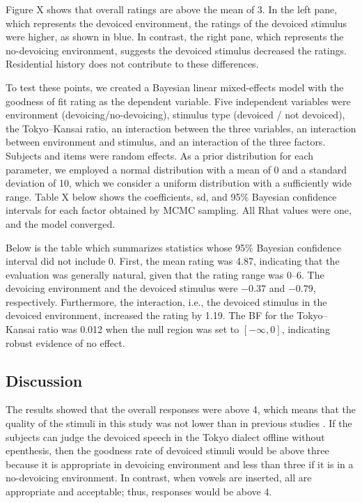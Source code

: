 \documentclass[a4paper,11pt,twocolumn]{article}
\begin{document}
Figure X shows that overall ratings are above the mean of 3. In the left pane, which represents the devoiced environment, the ratings of the devoiced stimulus were higher, as shown in blue. In contrast, the right pane, which represents the no-devoicing environment, suggests the devoiced stimulus decreased the ratings. Residential history does not contribute to these differences.

To test these points, we created a Bayesian linear mixed-effects model with the goodness of fit rating as the dependent variable. Five independent variables were environment (devoicing/no-devoicing), stimulus type (devoiced / not devoiced), the Tokyo--Kansai ratio, an interaction between the three variables, an interaction between environment and stimulus, and an interaction of the three factors. Subjects and items were random effects. As a prior distribution for each parameter, we employed a normal distribution with a mean of 0 and a standard deviation of 10, which we consider a uniform distribution with a sufficiently wide range. Table X below shows the coefficients, sd, and 95\% Bayesian confidence intervals for each factor obtained by MCMC sampling. All Rhat values were one, and the model converged.

Below is the table which summarizes statistics whose 95\% Bayesian confidence interval did not include 0. First, the mean rating was 4.87, indicating that the evaluation was generally natural, given that the rating range was 0--6. The devoicing environment and the devoiced stimulus were $-0.37$ and $-0.79$, respectively. Furthermore, the interaction, i.e., the devoiced stimulus in the devoiced environment, increased the rating by 1.19. The BF for the Tokyo--Kansai ratio was 0.012 when the null region was set to $[-\infty, 0]$, indicating robust evidence of no effect.

\subsection{Discussion}

The results showed that the overall responses were above 4, which means that the quality of the stimuli in this study was not lower than in previous studies \cite{kilpatrick2018japanese}. If the subjects can judge the devoiced speech in the Tokyo dialect offline without epenthesis, then the goodness rate of devoiced stimuli would be above three because it is appropriate in devoicing environment and less than three if it is in a no-devoicing environment. In contrast, when vowels are inserted, all are appropriate and acceptable; thus, responses would be above 4.
\end{document}
